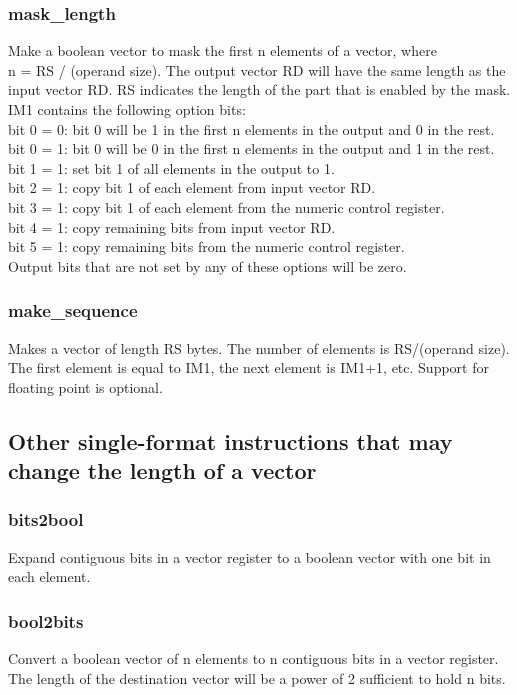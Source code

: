 \documentclass[forwardcom.tex]{subfiles}
\begin{document}
\subsubsection{mask\_length}
Make a boolean vector to mask the first n elements of a vector, where \\
n = RS / (operand size). The output vector RD will have the same length as the input vector RD. RS indicates the length of the part that is enabled by the mask. IM1 contains the following option bits: \\
bit 0 = 0: bit 0 will be 1 in the first n elements in the output and 0 in the rest. \\
bit 0 = 1: bit 0 will be 0 in the first n elements in the output and 1 in the rest. \\
bit 1 = 1: set bit 1 of all elements in the output to 1. \\
bit 2 = 1: copy bit 1 of each element from input vector RD. \\
bit 3 = 1: copy bit 1 of each element from the numeric control register. \\
bit 4 = 1: copy remaining bits from input vector RD. \\
bit 5 = 1: copy remaining bits from the numeric control register. \\
Output bits that are not set by any of these options will be zero.

\subsubsection{make\_sequence}
Makes a vector of length RS bytes. The number of elements is RS/(operand size).
The first element is equal to IM1, the next element is IM1+1, etc.
Support for floating point is optional.


\subsection{Other single-format instructions that may change the length of a vector}

\subsubsection{bits2bool}
Expand contiguous bits in a vector register to a boolean vector with one bit in each element.

\subsubsection{bool2bits}
Convert a boolean vector of n elements to n contiguous bits in a vector register.
The length of the destination vector will be a power of 2 sufficient to hold n bits.
\end{document}
